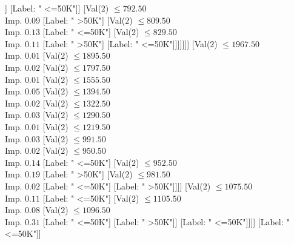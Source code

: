 \documentclass[margin=10pt]{standalone}
\begin{document}
\begin{forest}
																							[Label: " <=50K"]
																							[Label: " >50K"]]
																						[Label: " <=50K"]]
																					[Val($2$) $ \leq 792.50$ \\ Imp. $0.09$
																						[Label: " >50K"]
																						[Val($2$) $ \leq 809.50$ \\ Imp. $0.13$
																							[Label: " <=50K"]
																							[Val($2$) $ \leq 829.50$ \\ Imp. $0.11$
																								[Label: " >50K"]
																								[Label: " <=50K"]]]]]]]
																		[Val($2$) $ \leq 1967.50$ \\ Imp. $0.01$
																			[Val($2$) $ \leq 1895.50$ \\ Imp. $0.02$
																				[Val($2$) $ \leq 1797.50$ \\ Imp. $0.01$
																					[Val($2$) $ \leq 1555.50$ \\ Imp. $0.05$
																						[Val($2$) $ \leq 1394.50$ \\ Imp. $0.02$
																							[Val($2$) $ \leq 1322.50$ \\ Imp. $0.03$
																								[Val($2$) $ \leq 1290.50$ \\ Imp. $0.01$
																									[Val($2$) $ \leq 1219.50$ \\ Imp. $0.03$
																										[Val($2$) $ \leq 991.50$ \\ Imp. $0.02$
																											[Val($2$) $ \leq 950.50$ \\ Imp. $0.14$
																												[Label: " <=50K"]
																												[Val($2$) $ \leq 952.50$ \\ Imp. $0.19$
																													[Label: " >50K"]
																													[Val($2$) $ \leq 981.50$ \\ Imp. $0.02$
																														[Label: " <=50K"]
																														[Label: " >50K"]]]]
																											[Val($2$) $ \leq 1075.50$ \\ Imp. $0.11$
																												[Label: " <=50K"]
																												[Val($2$) $ \leq 1105.50$ \\ Imp. $0.08$
																													[Val($2$) $ \leq 1096.50$ \\ Imp. $0.31$
																														[Label: " <=50K"]
																														[Label: " >50K"]]
																													[Label: " <=50K"]]]]
																										[Label: " <=50K"]]

\end{forest}
\end{document}

